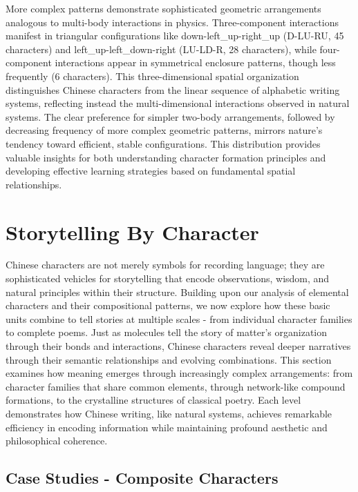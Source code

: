 \documentclass[11pt,letterpaper]{article}
\begin{document}
More complex patterns demonstrate sophisticated geometric arrangements
analogous to multi-body interactions in physics. Three-component
interactions manifest in triangular configurations like
down-left\_up-right\_up (D-LU-RU, 45 characters) and
left\_up-left\_down-right (LU-LD-R, 28 characters), while four-component
interactions appear in symmetrical enclosure patterns, though less
frequently (6 characters). This three-dimensional spatial organization
distinguishes Chinese characters from the linear sequence of alphabetic
writing systems, reflecting instead the multi-dimensional interactions
observed in natural systems. The clear preference for simpler two-body
arrangements, followed by decreasing frequency of more complex geometric
patterns, mirrors nature's tendency toward efficient, stable
configurations. This distribution provides valuable insights for both
understanding character formation principles and developing effective
learning strategies based on fundamental spatial relationships.

\section{Storytelling By Character}\label{storytelling-by-character}

Chinese characters are not merely symbols for recording language; they
are sophisticated vehicles for storytelling that encode observations,
wisdom, and natural principles within their structure. Building upon our
analysis of elemental characters and their compositional patterns, we
now explore how these basic units combine to tell stories at multiple
scales - from individual character families to complete poems. Just as
molecules tell the story of matter's organization through their bonds
and interactions, Chinese characters reveal deeper narratives through
their semantic relationships and evolving combinations. This section
examines how meaning emerges through increasingly complex arrangements:
from character families that share common elements, through network-like
compound formations, to the crystalline structures of classical poetry.
Each level demonstrates how Chinese writing, like natural systems,
achieves remarkable efficiency in encoding information while maintaining
profound aesthetic and philosophical coherence.

\subsection{Case Studies - Composite Characters}\label{case-studies---composite-characters}
\end{document}
